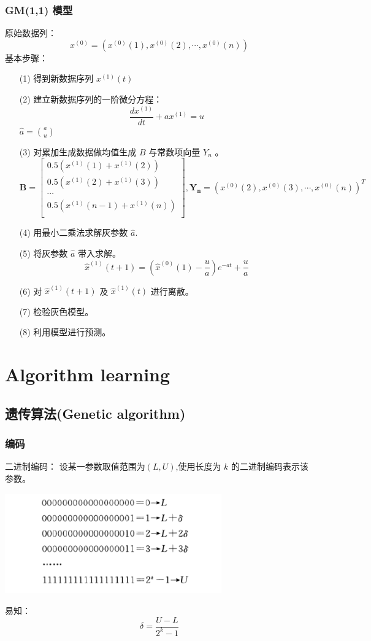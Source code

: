 \documentclass[12pt,a4paper]{article}
\begin{document}
\subsubsection{GM(1,1) 模型}
原始数据列：
$$x^{(0)} = (x^{(0)}(1), x^{(0)}(2),\cdots ,x^{(0)}(n))$$
基本步骤：
\begin{enumerate}
  \item [(1)] 得到新数据序列 $x^{(1)}(t)$
  \item [(2)] 建立新数据序列的一阶微分方程：
  $$\frac{dx^{(1)}}{dt}+ax^{(1)} = u$$
  $\hat a = \binom a u$
  \item [(3)] 对累加生成数据做均值生成 $B$ 与常数项向量 $Y_n$ 。
  \begin{equation*}
    \mathbf{B} = \left[
    \begin{array}{c}
      0.5(x^{(1)}(1)+x^{(1)}(2))\\
      0.5(x^{(1)}(2)+x^{(1)}(3))\\
      \cdots \\
      0.5(x^{(1)}(n-1)+x^{(1)}(n))\\
    \end{array} \right],
    \mathbf{Y_n} = (x^{(0)}(2),x^{(0)}(3) ,\cdots, x^{(0)}(n))^T
  \end{equation*}
  \item [(4)] 用最小二乘法求解灰参数 $\hat a$.
  \item [(5)] 将灰参数 $\hat a$ 带入求解。
  $$\hat x ^{(1)}(t+1)=(\hat x^{(0)}(1) - \frac{u}{a})e^{-at} + \frac{u}{a}$$
  \item [(6)] 对 $\hat x ^{(1)}(t+1)$ 及 $\hat x ^{(1)}(t)$ 进行离散。
  \item [(7)] 检验灰色模型。
  \item [(8)] 利用模型进行预测。
\end{enumerate}


\section{Algorithm learning}
\subsection{遗传算法(Genetic algorithm)}
\subsubsection{编码}
二进制编码：
设某一参数取值范围为$(L,U)$,使用长度为 $k$ 的二进制编码表示该参数。
\begin{center}
  \includegraphics[width=0.7\textwidth]{figures/encoding}
\end{center}
易知：
$$\delta = \frac{U-L}{2^k-1}$$
\end{document}
